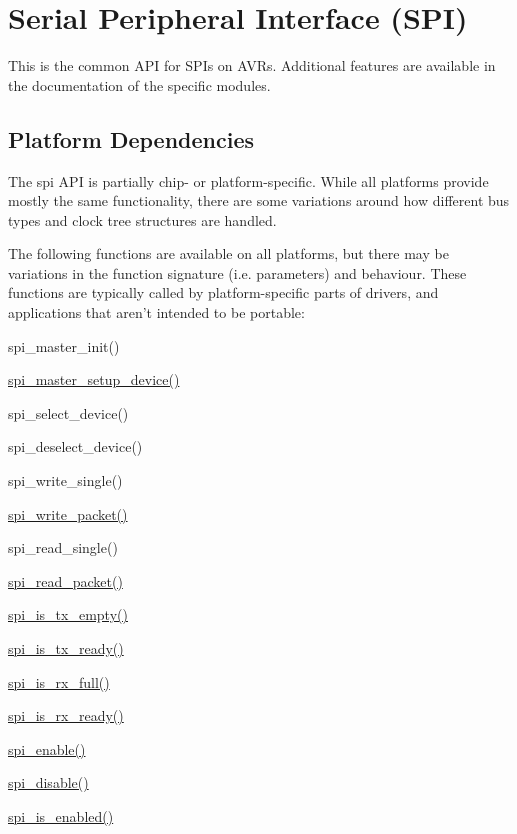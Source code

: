 \hypertarget{group__spi__group}{
\section{\-Serial \-Peripheral \-Interface (\-S\-P\-I)}
\label{group__spi__group}
}
\-This is the common \-A\-P\-I for \-S\-P\-Is on \-A\-V\-Rs. \-Additional features are available in the documentation of the specific modules.\hypertarget{group__spi__group_spi_group_platform}{}\subsection{\-Platform Dependencies}\label{group__spi__group_spi_group_platform}
\-The spi \-A\-P\-I is partially chip-\/ or platform-\/specific. \-While all platforms provide mostly the same functionality, there are some variations around how different bus types and clock tree structures are handled.

\-The following functions are available on all platforms, but there may be variations in the function signature (i.\-e. parameters) and behaviour. \-These functions are typically called by platform-\/specific parts of drivers, and applications that aren't intended to be portable\-:
\begin{DoxyItemize}
\item spi\-\_\-master\-\_\-init()
\item \hyperlink{spi__master_8c_adb8e173ada01040ae56a5f5868b50449}{spi\-\_\-master\-\_\-setup\-\_\-device()}
\item spi\-\_\-select\-\_\-device()
\item spi\-\_\-deselect\-\_\-device()
\item spi\-\_\-write\-\_\-single()
\item \hyperlink{spi__master_8c_a5eea18b25801b83f702f8ff49cfebc54}{spi\-\_\-write\-\_\-packet()}
\item spi\-\_\-read\-\_\-single()
\item \hyperlink{spi__master_8c_aafdacdffa212b9880873c82b0fb6d8e7}{spi\-\_\-read\-\_\-packet()}
\item \hyperlink{uc3__spi_2spi__master_8h_a7a08995ae2193f27979fdd0613f3f189}{spi\-\_\-is\-\_\-tx\-\_\-empty()}
\item \hyperlink{uc3__spi_2spi__master_8h_afc0784fc74e3a9c6bbf5de5aa87a413f}{spi\-\_\-is\-\_\-tx\-\_\-ready()}
\item \hyperlink{uc3__spi_2spi__master_8h_a8ec4bf90b5b8de62f3ce6aae2fdfa752}{spi\-\_\-is\-\_\-rx\-\_\-full()}
\item \hyperlink{uc3__spi_2spi__master_8h_aa137d54c8ea3799cf6f2b2c710569be6}{spi\-\_\-is\-\_\-rx\-\_\-ready()}
\item \hyperlink{spi_8c_ac93e5990e8abc811f4ba2fb65e10e94d}{spi\-\_\-enable()}
\item \hyperlink{spi_8c_a5cc4ac60e6ecf3cdc442265aaa0a63e0}{spi\-\_\-disable()}
\item \hyperlink{spi_8c_aa945d35a658c234e2cb650a53dcdaa37}{spi\-\_\-is\-\_\-enabled()} 
\end{DoxyItemize}